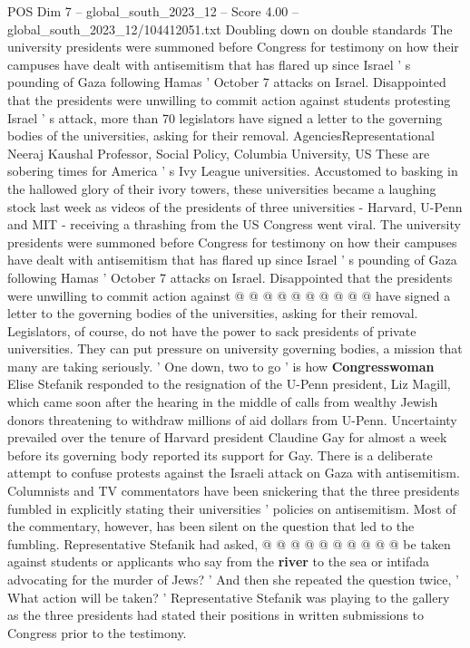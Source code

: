 \begin{textsample}{POS Dim 7 – global\_south\_2023\_12 – Score 4.00 – global\_south\_2023\_12/104412051.txt}  \label{ex:f7_pos_264}
Doubling down on double standards The university presidents were summoned before Congress for testimony on how their campuses have dealt with antisemitism that has flared up since Israel ' s pounding of Gaza following Hamas ' October 7 attacks on Israel.
Disappointed that the presidents were unwilling to commit action against students protesting Israel ' s attack, more than 70 legislators have signed a letter to the governing bodies of the universities, asking for their removal.
AgenciesRepresentational Neeraj Kaushal Professor, Social Policy, Columbia University, US These are sobering times for America ' s Ivy League universities.
Accustomed to basking in the hallowed glory of their ivory towers, these universities became a laughing stock last week as videos of the presidents of three universities - Harvard, U-Penn and MIT - receiving a thrashing from the US Congress went viral.
The university presidents were summoned before Congress for testimony on how their campuses have dealt with antisemitism that has flared up since Israel ' s pounding of Gaza following Hamas ' October 7 attacks on Israel.
Disappointed that the presidents were unwilling to commit action against @ @ @ @ @ @ @ @ @ @ have signed a letter to the governing bodies of the universities, asking for their removal.
Legislators, of course, do not have the power to sack presidents of private universities.
They can put pressure on university governing bodies, a mission that many are taking seriously. ' One down, two to go ' is how \textbf{Congresswoman} Elise Stefanik responded to the resignation of the U-Penn president, Liz Magill, which came soon after the hearing in the middle of calls from wealthy Jewish donors threatening to withdraw millions of aid dollars from U-Penn.
Uncertainty prevailed over the tenure of Harvard president Claudine Gay for almost a week before its governing body reported its support for Gay.
There is a deliberate attempt to confuse protests against the Israeli attack on Gaza with antisemitism.
Columnists and TV commentators have been snickering that the three presidents fumbled in explicitly stating their universities ' policies on antisemitism.
Most of the commentary, however, has been silent on the question that led to the fumbling.
Representative Stefanik had asked, @ @ @ @ @ @ @ @ @ @ be taken against students or applicants who say from the \textbf{river} to the sea or intifada advocating for the murder of Jews? ' And then she repeated the question twice, ' What action will be taken? ' Representative Stefanik was playing to the gallery as the three presidents had stated their positions in written submissions to Congress prior to the testimony.

\end{textsample}
